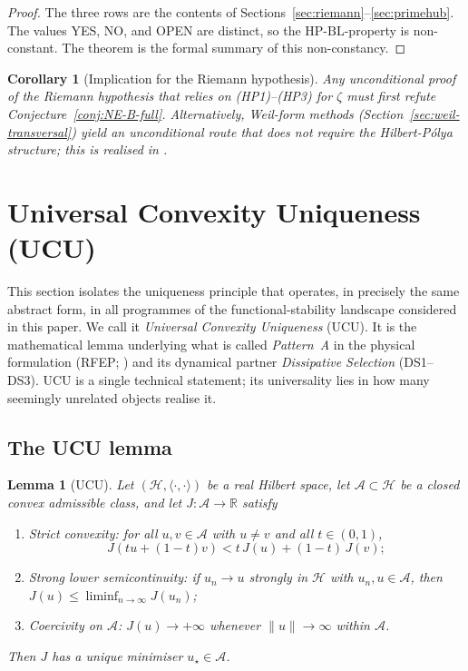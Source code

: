 \documentclass[11pt]{article}
\newtheorem{corollary}[theorem]{Corollary}
\newtheorem{lemma}[theorem]{Lemma}
\theoremstyle{definition}
\theoremstyle{remark}
\newcommand{\HBL}{\mathrm{HP\text{-}BL}}
\begin{document}
\begin{proof}
The three rows are the contents of
Sections~\ref{sec:riemann}--\ref{sec:primehub}. The values YES, NO,
and OPEN are distinct, so the $\HBL$-property is non-constant. The
theorem is the formal summary
of this non-constancy.
\end{proof}

\begin{corollary}[Implication for the Riemann hypothesis]
\label{cor:rh-consequence}
Any unconditional proof of the Riemann hypothesis that relies on
(HP1)--(HP3) for $\zeta$ must first refute
Conjecture~\ref{conj:NE-B-full}. Alternatively, Weil-form methods
(Section~\ref{sec:weil-transversal}) yield an unconditional route
that does not require the Hilbert-P\'olya structure; this is
realised in \cite{Geiger2026RHII}.
\end{corollary}

\section{Universal Convexity Uniqueness (UCU)}
\label{sec:ucu}

This section isolates the uniqueness principle that operates, in
precisely the same abstract form, in all programmes of the
functional-stability landscape considered in this paper. We call
it \emph{Universal Convexity Uniqueness} (UCU). It is the
mathematical lemma underlying what is called \emph{Pattern~A} in
the physical formulation (RFEP; \cite{RFEPFramework}) and its
dynamical partner \emph{Dissipative Selection} (DS1--DS3). UCU is
a single technical statement; its universality lies in how many
seemingly unrelated objects realise it.

\subsection{The UCU lemma}
\label{sec:ucu-lemma}

\begin{lemma}[UCU]\label{lem:ucu}
Let $(\mathcal{H}, \langle\cdot,\cdot\rangle)$ be a real Hilbert
space, let $\mathcal{A} \subset \mathcal{H}$ be a closed convex
admissible class, and let $J : \mathcal{A} \to \mathbb{R}$ satisfy
\begin{enumerate}
\item[(C)] \emph{Strict convexity:} for all $u,v \in \mathcal{A}$
with $u \neq v$ and all $t \in (0,1)$,
\[
  J(tu + (1-t)v) < t\,J(u) + (1-t)\,J(v);
\]
\item[(L)] \emph{Strong lower semicontinuity:} if $u_n \to u$
strongly in $\mathcal{H}$ with $u_n, u \in \mathcal{A}$, then
$J(u) \leq \liminf_{n\to\infty} J(u_n)$;
\item[(K)] \emph{Coercivity on $\mathcal{A}$:} $J(u) \to +\infty$
whenever $\|u\| \to \infty$ within $\mathcal{A}$.
\end{enumerate}
Then $J$ has a unique minimiser $u_\star \in \mathcal{A}$.
\end{lemma}
\end{document}
